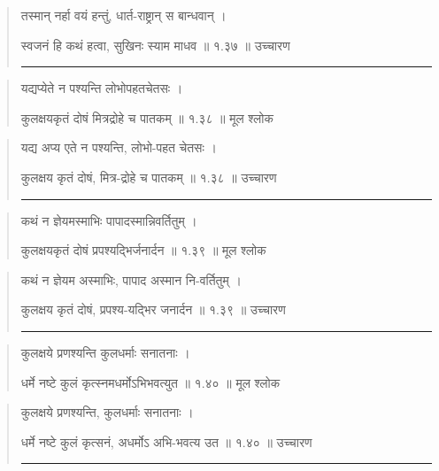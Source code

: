 \begin{quotation}

तस्मान् नर्हा वयं हन्तुं, धार्त-राष्ट्रान् स बान्धवान्  ।  


स्वजनं हि कथं हत्वा, सुखिनः स्याम माधव  ॥ १.३७ ॥  उच्चारण

\noindent\rule{16cm}{0.4pt}
\end{quotation}


\begin{quotation}
यद्यप्येते न पश्यन्ति लोभोपहतचेतसः  ।  

कुलक्षयकृतं दोषं मित्रद्रोहे च पातकम्‌  ॥ १.३८ ॥  मूल श्लोक
\end{quotation}

\begin{quotation}

यद्य अप्य एते न पश्यन्ति, लोभो-पहत चेतसः  ।  


कुलक्षय कृतं दोषं, मित्र-द्रोहे च पातकम्  ॥ १.३८ ॥  उच्चारण

\noindent\rule{16cm}{0.4pt} 
\end{quotation}


\begin{quotation} 
कथं न ज्ञेयमस्माभिः पापादस्मान्निवर्तितुम्‌  ।  


कुलक्षयकृतं दोषं प्रपश्यद्भिर्जनार्दन  ॥ १.३९ ॥  मूल श्लोक
\end{quotation}

\begin{quotation}

कथं न ज्ञेयम अस्माभिः, पापाद अस्मान नि-वर्तितुम्‌  ।  


कुलक्षय कृतं दोषं, प्रपश्य-यद्भिर जनार्दन  ॥ १.३९ ॥  उच्चारण

\noindent\rule{16cm}{0.4pt} 
\end{quotation}


\begin{quotation} 

कुलक्षये प्रणश्यन्ति कुलधर्माः सनातनाः  ।  


धर्मे नष्टे कुलं कृत्स्नमधर्मोऽभिभवत्युत  ॥ १.४० ॥  मूल श्लोक
\end{quotation}

\begin{quotation}

कुलक्षये प्रणश्यन्ति, कुलधर्माः सनातनाः  ।  


धर्मे नष्टे कुलं कृत्सनं, अधर्मोऽ अभि-भवत्य उत  ॥ १.४० ॥  उच्चारण

\noindent\rule{16cm}{0.4pt} 
\end{quotation}


